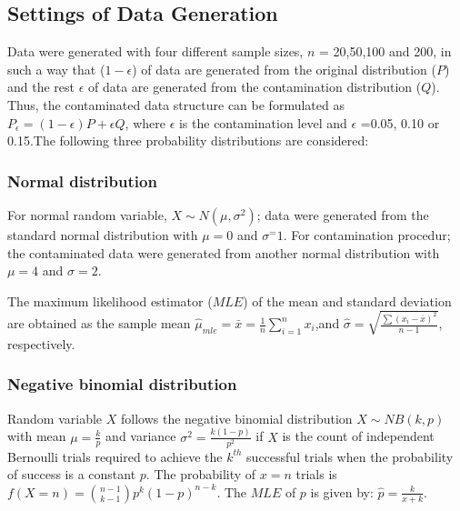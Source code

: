 \documentclass[notitlepage,12pt]{jedm}
\begin{document}
\hypertarget{settings-of-data-generation}{%
\subsection{Settings of Data
Generation}\label{settings-of-data-generation}}

Data were generated with four different sample sizes, \(n\) = 20,50,100
and 200, in such a way that (\(1-\epsilon\)) of data are generated from
the original distribution (\(P\)) and the rest \(\epsilon\) of data are
generated from the contamination distribution (\(Q\)). Thus, the
contaminated data structure can be formulated as
\(P_{\epsilon}=(1-\epsilon)P+\epsilon Q\), where \(\epsilon\) is the
contamination level and \(\epsilon\) =0.05, 0.10 or 0.15.The following
three probability distributions are considered:

\hypertarget{normal-distribution}{%
\subsubsection{Normal distribution}\label{normal-distribution}}

For normal random variable, \(X\sim N(\mu,\sigma^2)\); data were
generated from the standard normal distribution with \(\mu = 0\) and
\(\sigma^= 1\). For contamination procedur; the contaminated data were
generated from another normal distribution with \(\mu = 4\) and
\(\sigma = 2\).

The maximum likelihood estimator (\(MLE\)) of the mean and standard
deviation are obtained as the sample mean
\(\hat{\mu}_{mle} = \bar{x} = \frac{1}{n} \sum_{i=1}^n x_i\),and
\(\hat{\sigma} = \sqrt{\frac{\sum (x_{i} - \bar{x})^{2}}{n - 1}}\),
respectively.

\hypertarget{negative-binomial-distribution}{%
\subsubsection{Negative binomial
distribution}\label{negative-binomial-distribution}}

Random variable \(X\) follows the negative binomial distribution
\(X \sim NB(k,p)\) with mean \(\mu =\frac{k}{p}\) and variance
\(\sigma^2= \frac{k(1-p)}{p^2}\) if \(X\) is the count of independent
Bernoulli trials required to achieve the \(k^{th}\) successful trials
when the probability of success is a constant \(p\). The probability of
\(x=n\) trials is \(f(X=n)= {n-1 \choose k-1} p^k (1-p)^{n-k}\). The
\(MLE\) of \(p\) is given by: \(\hat{p} = \frac{k}{x + k}\).
\end{document}

